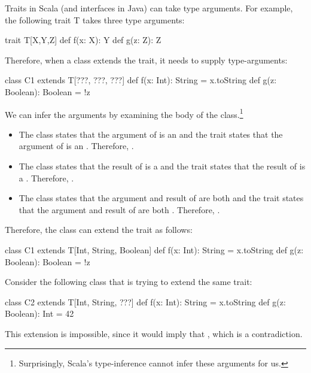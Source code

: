 \documentclass[9pt]{extbook}
\begin{document}
Traits in Scala (and interfaces in Java) can take type arguments.
For example, the following trait T takes three type arguments:
\begin{scalacode}
trait T[X,Y,Z] {
  def f(x: X): Y
  def g(z: Z): Z
}
\end{scalacode}
Therefore, when a class extends the trait, it needs to supply type-arguments:
\begin{scalacode}
class C1 extends T[???, ???, ???] {
  def f(x: Int): String = x.toString
  def g(z: Boolean): Boolean = !z
}
\end{scalacode}
We can infer the arguments by examining the body of the
class.\footnote{Surprisingly, Scala's type-inference cannot infer these arguments for us.}
\begin{itemize}
  \item The class states that the argument of  is an 
  and the trait states that the argument of  is an .
  Therefore, .

  \item The class states that the result of  is a 
  and the trait states that the result of  is a .
  Therefore, .

  \item The class states that the argument and result of  are both 
  and the trait states that the argument and result of  are both .
  Therefore, .
\end{itemize}
Therefore, the class can extend the trait as follows:
\begin{scalacode}
class C1 extends T[Int, String, Boolean] {
  def f(x: Int): String = x.toString
  def g(z: Boolean): Boolean = !z
}
\end{scalacode}

Consider the following class that is trying to extend the same trait:
\begin{scalacode}
class C2 extends T[Int, String, ???] {
  def f(x: Int): String = x.toString
  def g(z: Boolean): Int = 42
}
\end{scalacode}
This extension is impossible, since it would imply that , which
is a contradiction.
\end{document}
